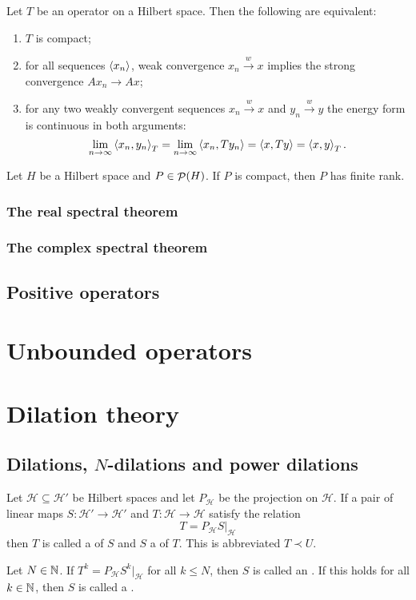 \begin{proposition}
Let $T$ be an operator on a Hilbert space. Then the following are equivalent:
\begin{enumerate}
\item $T$ is compact;
\item for all sequences $\langle x_n \rangle$, weak convergence $x_n \overset{w}{\to} x$ implies the strong convergence $Ax_n \to Ax$;
\item for any two weakly convergent sequences $x_n\overset{w}{\to} x$ and $y_n\overset{w}{\to} y$ the energy form is continuous in both arguments:
\[ \lim_{n\to\infty}\left\langle x_n,y_n \right\rangle_T = \lim_{n\to\infty}\left\langle x_n,Ty_n \right\rangle = \left\langle x,Ty \right\rangle = \left\langle x,y \right\rangle_T. \]
\end{enumerate} 
\end{proposition}

\begin{lemma}
Let $H$ be a Hilbert space and $P\in\mathop{\mathcal{P}}\nolimits(H)$. If $P$ is compact, then $P$ has finite rank.
\end{lemma}

\subsubsection{The real spectral theorem}
\subsubsection{The complex spectral theorem}

\subsection{Positive operators}



\section{Unbounded operators}

\section{Dilation theory}
\subsection{Dilations, $N$-dilations and power dilations}
\begin{definition}
Let $\mathcal{H} \subseteq \mathcal{H}'$ be Hilbert spaces and let $P_\mathcal{H}$ be the projection on $\mathcal{H}$. If a pair of linear maps $S: \mathcal{H}'\to\mathcal{H}'$ and $T: \mathcal{H}\to \mathcal{H}$ satisfy the relation
\[ T = P_\mathcal{H} S |_\mathcal{H} \]
then $T$ is called a  of $S$ and $S$ a  of $T$. This is abbreviated $T\prec U$.

Let $N\in\mathbb{N}$. If $T^k = P_\mathcal{H} S^k |_\mathcal{H}$ for all $k\leq N$, then $S$ is called an . If this holds for all $k\in\mathbb{N}$, then $S$ is called a .
\end{definition}


